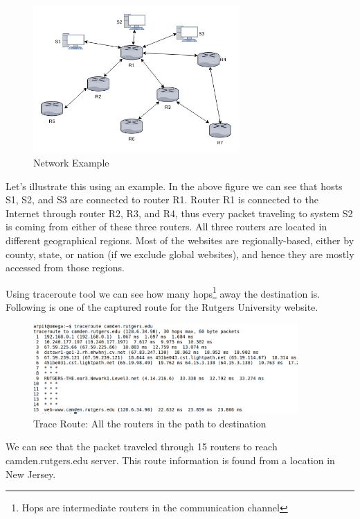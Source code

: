 \documentclass[12pt,oneside,a4paper]{article}
\begin{document}
\begin{figure}[H]
\centering
\includegraphics[width=0.70\textwidth]{routers.jpg}
\caption{Network Example} \label{fig:routers}
\end{figure}

Let's illustrate this using an example. In the above figure we can see that hosts S1, S2, and S3 are connected to router R1. Router R1 is connected to the Internet through router R2, R3, and R4, thus every packet traveling to system S2 is coming from either of these three routers. All three routers are located in different geographical regions. Most of the websites are regionally-based, either by county, state, or nation (if we exclude global websites), and hence they are mostly accessed from those regions.\par

Using traceroute tool we can see how many hops\footnote{Hops are intermediate routers in the communication channel} away the destination is. Following is one of the captured route for the Rutgers University website.\par
\begin{figure}[H]
\centering
\includegraphics[width=0.90\textwidth]{TraceRoute.png}
\caption{Trace Route: All the routers in the path to destination} \label{fig:traceroute}
\end{figure}

We can see that the packet traveled through 15 routers to reach camden.rutgers.edu server. This route information is found from a location in New Jersey.\par
\pagebreak
\end{document}
